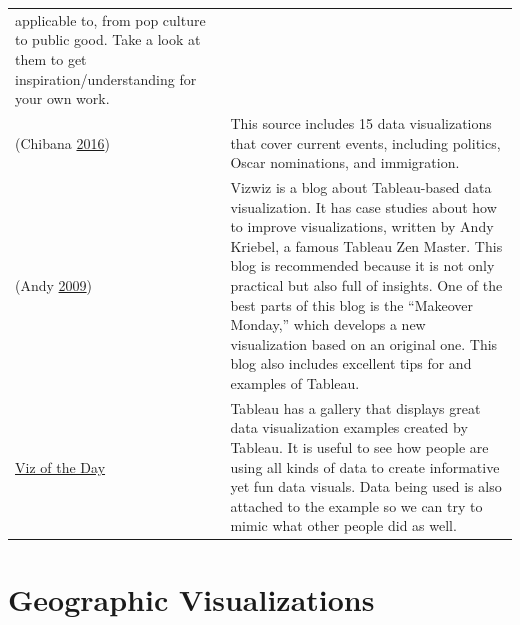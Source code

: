 \documentclass[]{book}
\begin{document}
\begin{longtable}[]{@{}ll@{}}
\begin{minipage}[t]{0.79\columnwidth}
applicable to, from pop culture to public good. Take a look at them to
get inspiration/understanding for your own work.\strut
\end{minipage}\tabularnewline
\begin{minipage}[t]{0.15\columnwidth}\raggedright\strut
(Chibana \protect\hyperlink{ref-int_viz_current}{2016})\strut
\end{minipage} & \begin{minipage}[t]{0.79\columnwidth}\raggedright\strut
This source includes 15 data visualizations that cover current events,
including politics, Oscar nominations, and immigration.\strut
\end{minipage}\tabularnewline
\begin{minipage}[t]{0.15\columnwidth}\raggedright\strut
(Andy \protect\hyperlink{ref-vizwiz}{2009})\strut
\end{minipage} & \begin{minipage}[t]{0.79\columnwidth}\raggedright\strut
Vizwiz is a blog about Tableau-based data visualization. It has case
studies about how to improve visualizations, written by Andy Kriebel, a
famous Tableau Zen Master. This blog is recommended because it is not
only practical but also full of insights. One of the best parts of this
blog is the ``Makeover Monday,'' which develops a new visualization
based on an original one. This blog also includes excellent tips for and
examples of Tableau.\strut
\end{minipage}\tabularnewline
\begin{minipage}[t]{0.15\columnwidth}\raggedright\strut
\href{https://public.tableau.com/en-us/s/gallery}{Viz of the Day}\strut
\end{minipage} & \begin{minipage}[t]{0.79\columnwidth}\raggedright\strut
Tableau has a gallery that displays great data visualization examples
created by Tableau. It is useful to see how people are using all kinds
of data to create informative yet fun data visuals. Data being used is
also attached to the example so we can try to mimic what other people
did as well.\strut
\end{minipage}\tabularnewline
\bottomrule
\end{longtable}

\section{Geographic Visualizations}\label{geographic-visualizations}
\end{document}
